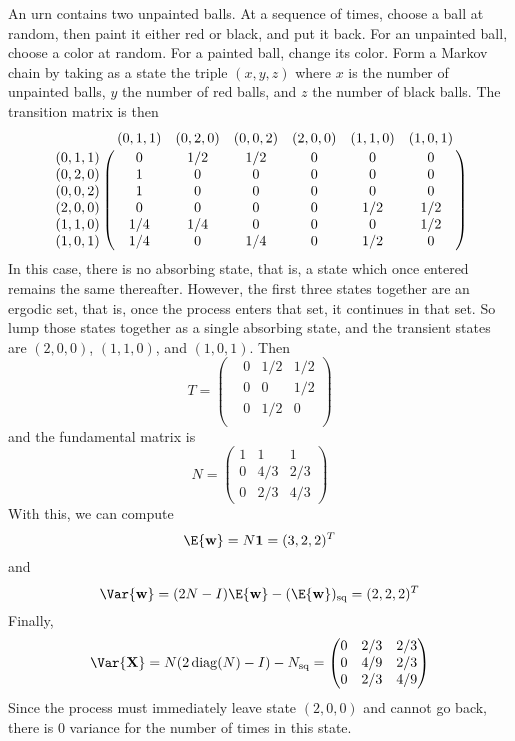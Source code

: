 \documentclass[12pt]{article}
\begin{document}
\begin{example}
    An urn contains two unpainted balls.  At a sequence of times, choose
    a ball at random, then paint it either red or black, and put it back.
    For an unpainted ball, choose a color at random.  For a painted
    ball, change its color.  Form a Markov chain by taking as a state
    the triple \( (x,y,z) \) where \( x \) is the number of unpainted
    balls, \( y \) the number of red balls, and \( z \) the number of
    black balls.  The transition matrix is then
    \[
        \bordermatrix{
                    & (0,1,1) & (0,2,0) & (0,0,2) & (2,0,0) & (1,1,0) & (1,0,1)
            \cr
            (0,1,1) & 0 & 1/2 & 1/2 & 0 & 0 & 0 \cr
            (0,2,0) & 1 & 0 & 0 & 0 & 0 & 0 \cr
            (0,0,2) & 1 & 0 & 0 & 0 & 0 & 0 \cr
            (2,0,0) & 0 & 0 & 0 & 0 & 1/2 & 1/2 \cr
            (1,1,0) & 1/4 & 1/4 & 0 & 0 & 0 & 1/2 \cr
            (1,0,1) & 1/4 & 0 & 1/4 & 0 & 1/2 & 0 \cr
        }
    \] In this case, there is no absorbing state, that is, a state which
    once entered remains the same thereafter.  However, the first three
    states together are an ergodic set, that is, once the process enters
    that set, it continues in that set.  So lump those states together
    as a single absorbing state, and the transient states are \( (2,0,0)
    \), \( (1,1,0) \), and \( (1,0,1) \).  Then
    \[
        T =
        \begin{pmatrix}
            & 0 & 1/2 & 1/2 \\
            & 0 & 0 & 1/2 \\
            & 0 & 1/2 & 0 \\
        \end{pmatrix}
    \] and the fundamental matrix is
    \[
        N =
        \begin{pmatrix}
            1 & 1 & 1\\
            0 & 4/3 & 2/3\\
            0 & 2/3 & 4/3
        \end{pmatrix}
    \] With this, we can compute
    \[
        \E{\mathbf{w}} = N \mathbf{1} = (3, 2, 2)^T
    \] and
    \[
        \Var{\mathbf{w}} = (2N-I)\E{\mathbf{w}}-(\E{\mathbf{w}})_{\text{sq}} = (2,2,2)^T
    \] Finally,
    \[
        \Var{\mathbf{X}} = N(2
        \operatorname{diag}
        (N) - I) - N_{\text{sq}} =
        \begin{pmatrix}
            0 & 2/3 & 2/3 \\
            0 & 4/9 & 2/3 \\
            0 & 2/3 & 4/9
        \end{pmatrix}
    \] Since the process must immediately leave state \( (2,0,0) \) and
    cannot go back, there is \( 0 \) variance for the number of times in
    this state.
\end{example}
\end{document}
